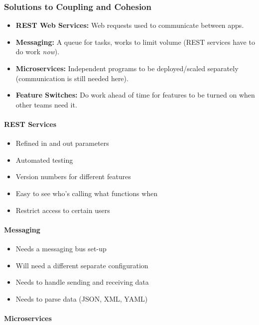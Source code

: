 \subsubsection{Solutions to Coupling and Cohesion}\label{ssub:solutions_to_coupling_and_cohesion}

\begin{itemize}
	\item \textbf{REST Web Services:} Web requests used to communicate between apps.
	\item \textbf{Messaging:} A queue for tasks, works to limit volume (REST services have to do work \emph{now}).
	\item \textbf{Microservices:} Independent programs to be deployed/scaled separately (communication is still needed here).
	\item \textbf{Feature Switches:} Do work ahead of time for features to be turned on when other teams need it.
\end{itemize}

\paragraph{REST Services}\label{par:rest_services}

\begin{itemize}
	\item Refined in and out parameters
	\item Automated testing
	\item Version numbers for different features
	\item Easy to see who's calling what functions when
	\item Restrict access to certain users
\end{itemize}

\paragraph{Messaging}\label{par:messaging}

\begin{itemize}
	\item Needs a messaging bus set-up
	\item Will need a different separate configuration
	\item Needs to handle sending and receiving data
	\item Needs to parse data (JSON, XML, YAML)
\end{itemize}

\paragraph{Microservices}\label{par:microservices}

